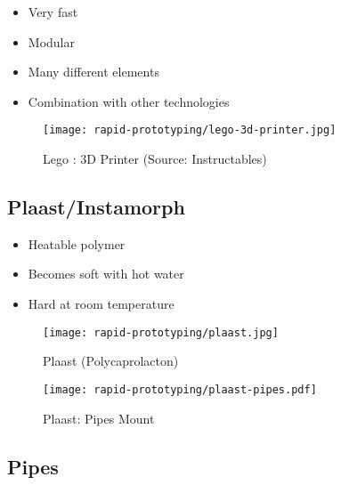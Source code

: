 \documentclass[aspectratio=169]{beamer}
\begin{document}
\begin{frame}
    \begin{itemize}
        \item Very fast
        \item Modular
        \item Many different elements
        \item Combination with other technologies
    \end{itemize}
    \begin{figure}
        \texttt{[image: rapid-prototyping/lego-3d-printer.jpg]}
        \caption{Lego \texttrademark: 3D Printer (Source: Instructables)}
    \end{figure}
\end{frame}

\subsection{Plaast/Instamorph}

\begin{frame}
    \begin{itemize}
        \item Heatable polymer
        \item Becomes soft with hot water
        \item Hard at room temperature
    \end{itemize}
    \begin{figure}
        \texttt{[image: rapid-prototyping/plaast.jpg]}
        \caption{Plaast (Polycaprolacton)}
    \end{figure}
\end{frame}

\begin{frame}
    \begin{figure}
        \texttt{[image: rapid-prototyping/plaast-pipes.pdf]}
        \caption{Plaast: Pipes Mount}
    \end{figure}
\end{frame}

\subsection{ Pipes}
\end{document}
